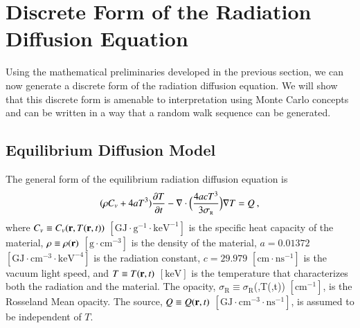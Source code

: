 \documentclass[preprint,12pt]{elsarticle}
\newcommand{\Cv}{\ensuremath{C_{v}}}
\newcommand{\ros}{\ensuremath{\sigma_{\scriptscriptstyle\mathrm{R}}}}
\begin{document}
\section{Discrete Form of the Radiation Diffusion Equation}
\label{sec:discr-form-radi}

Using the mathematical preliminaries developed in the previous section, we can
now generate a discrete form of the radiation diffusion equation. We will show
that this discrete form is amenable to interpretation using Monte Carlo
concepts and can be written in a way that a random walk sequence can be
generated.

\subsection{Equilibrium Diffusion Model}

The general form of the equilibrium radiation diffusion equation is
\cite{morel_1996}
\begin{equation}
  (\rho\Cv + 4aT^{3})\pder{T}{t} -
  \nabla\cdot{\Bigl(\frac{4acT^{3}}{3\ros}\Bigr)\grad{T}} = Q\:,
  \label{eq:eq-diff-T}
\end{equation}
where $\Cv\equiv\Cv(\ve{r},T(\ve{r},t))$
$[\text{GJ}\cdot\text{g}^{-1}\cdot\text{keV}^{-1}]$ is the specific heat
capacity of the material, $\rho\equiv\rho(\mathbf{r})$
$[\text{g}\cdot\text{cm}^{-3}]$ is the density of the material, $a=0.01372$
$[\text{GJ}\cdot\text{cm}^{-3}\cdot\text{keV}^{-4}]$ is the radiation
constant, $c=29.979$ $[\text{cm}\cdot\text{ns}^{-1}]$ is the vacuum light
speed, and $T\equiv T(\mathbf{r},t)$ $[\text{keV}]$ is the temperature that
characterizes both the radiation and the material.  The opacity,
$\ros\equiv\ros$(,T(,t)) $[\text{cm}^{-1}]$, is the Rosseland Mean
opacity.  The source, $Q\equiv Q(\mathbf{r},t)$
$[\text{GJ}\cdot\text{cm}^{-3}\cdot\text{ns}^{-1}]$, is assumed to be
independent of $T$.
\end{document}
